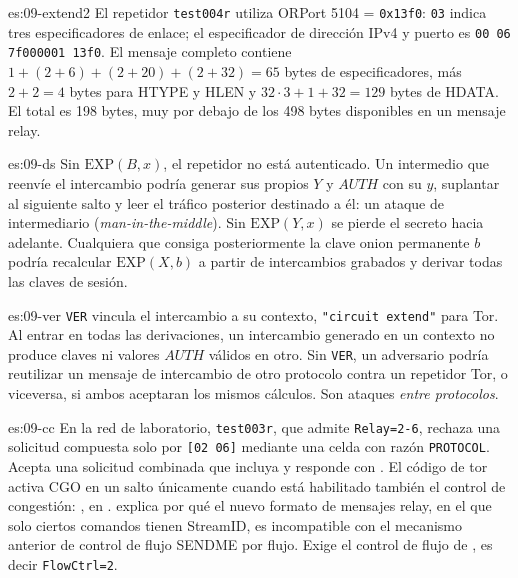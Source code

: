 \begin{soluzione}{es:09-extend2}
El repetidor \texttt{test004r} utiliza ORPort 5104 = \texttt{0x13f0}: \texttt{03} indica tres especificadores de enlace; el especificador de dirección IPv4 y puerto es \texttt{00 06 7f000001 13f0}. El mensaje completo contiene $1+(2+6)+(2+20)+(2+32)=65$ bytes de especificadores, más $2+2=4$ bytes para HTYPE y HLEN y $32\cdot3+1+32=129$ bytes de HDATA. El total es 198 bytes, muy por debajo de los 498 bytes disponibles en un mensaje relay.
\end{soluzione}

\begin{soluzione}{es:09-ds}
Sin $\mathrm{EXP}(B,x)$, el repetidor no está autenticado. Un intermedio que reenvíe el intercambio podría generar sus propios $Y$ y $\mathit{AUTH}$ con su $y$, suplantar al siguiente salto y leer el tráfico posterior destinado a él: un ataque de intermediario (\emph{man-in-the-middle}). Sin $\mathrm{EXP}(Y,x)$ se pierde el secreto hacia adelante. Cualquiera que consiga posteriormente la clave onion permanente $b$ podría recalcular $\mathrm{EXP}(X,b)$ a partir de intercambios grabados y derivar todas las claves de sesión.
\end{soluzione}

\begin{soluzione}{es:09-ver}
\texttt{VER} vincula el intercambio a su contexto, \texttt{"circuit extend"} para Tor. Al entrar en todas las derivaciones, un intercambio generado en un contexto no produce claves ni valores $\mathit{AUTH}$ válidos en otro. Sin \texttt{VER}, un adversario podría reutilizar un mensaje de intercambio de otro protocolo contra un repetidor Tor, o viceversa, si ambos aceptaran los mismos cálculos. Son ataques \emph{entre protocolos}.
\end{soluzione}

\begin{soluzione}{es:09-cc}
En la red de laboratorio, \texttt{test003r}, que admite \texttt{Relay=2-6}, rechaza una solicitud compuesta solo por \texttt{[02 06]} mediante una celda  con razón \texttt{PROTOCOL}. Acepta una solicitud combinada que incluya  y responde con . El código de tor activa CGO en un salto únicamente cuando está habilitado también el control de congestión: , en .  explica por qué el nuevo formato de mensajes relay, en el que solo ciertos comandos tienen StreamID, es incompatible con el mecanismo anterior de control de flujo SENDME por flujo. Exige el control de flujo de , es decir \texttt{FlowCtrl=2}.
\end{soluzione}

